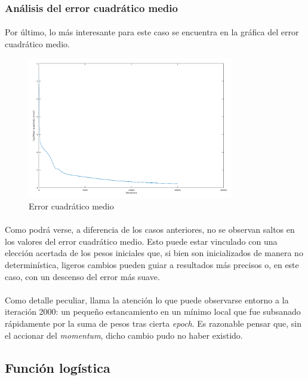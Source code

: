\documentclass[12pt, twocolumn]{article}
\begin{document}
	\subsubsection{Análisis del error cuadrático medio}
	
	\paragraph{} Por último, lo más interesante para este caso se encuentra en la gráfica del error cuadrático medio. 
	
	\begin{figure}[H]
		\centering
		\includegraphics[width=9cm]{../results/batch_variable/1/log_batch.png}
		\caption{Error cuadrático medio}
		\label{error3}
	\end{figure}
	
	\paragraph{} Como podrá verse, a diferencia de los casos anteriores, no se observan saltos en los valores del error cuadrático medio. Esto puede estar vinculado con una elección acertada de los pesos iniciales que, si bien son inicializados de manera no determinística, ligeros cambios pueden guiar a resultados más precisos o, en este caso, con un descenso del error más suave. 
	
	\paragraph{} Como detalle peculiar, llama la atención lo que puede observarse entorno a la iteración 2000: un pequeño estancamiento en un mínimo local que fue subsanado rápidamente por la suma de pesos tras cierta \textit{epoch}. Es razonable pensar que, sin el accionar del \textit{momentum}, dicho cambio pudo no haber existido. 
	
	\subsection{Función logística}
	
\end{document}
